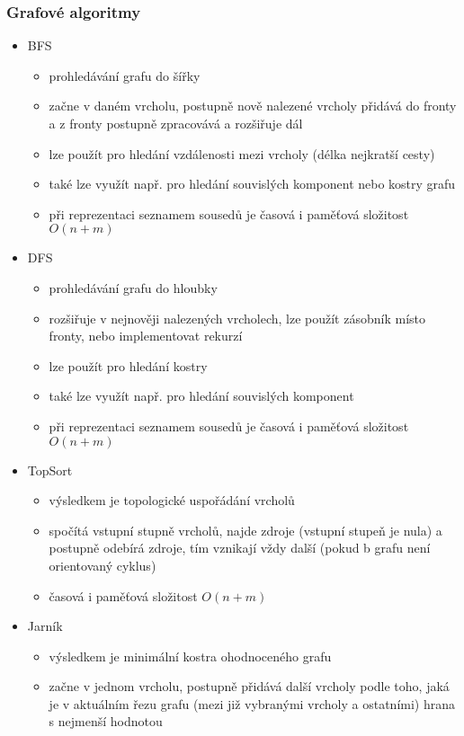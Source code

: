 \subsubsection*{Grafové algoritmy}
\begin{itemize}
	\item BFS
	\begin{itemize}
		\item prohledávání grafu do šířky
		\item začne v daném vrcholu, postupně nově nalezené vrcholy přidává do fronty a z fronty postupně zpracovává a rozšiřuje dál
		\item lze použít pro hledání vzdálenosti mezi vrcholy (délka nejkratší cesty)
		\item také lze využít např. pro hledání souvislých komponent nebo kostry grafu
		\item při reprezentaci seznamem sousedů je časová i paměťová složitost $O(n + m)$
	\end{itemize}
	\item DFS
	\begin{itemize}
		\item prohledávání grafu do hloubky
		\item rozšiřuje v nejnověji nalezených vrcholech, lze použít zásobník místo fronty, nebo implementovat rekurzí
		\item lze použít pro hledání kostry
		\item také lze využít např. pro hledání souvislých komponent
		\item při reprezentaci seznamem sousedů je časová i paměťová složitost $O(n + m)$
	\end{itemize}
	\item TopSort
	\begin{itemize}
		\item výsledkem je topologické uspořádání vrcholů
		\item spočítá vstupní stupně vrcholů, najde zdroje (vstupní stupeň je nula) a postupně odebírá zdroje, tím vznikají vždy další (pokud b grafu není orientovaný cyklus)
		\item časová i paměťová složitost $O(n + m)$
	\end{itemize}
	\item Jarník
	\begin{itemize}
		\item výsledkem je minimální kostra ohodnoceného grafu
		\item začne v jednom vrcholu, postupně přidává další vrcholy podle toho, jaká je v aktuálním řezu grafu (mezi již vybranými vrcholy a ostatními) hrana s nejmenší hodnotou

\end{itemize}
\end{itemize}
